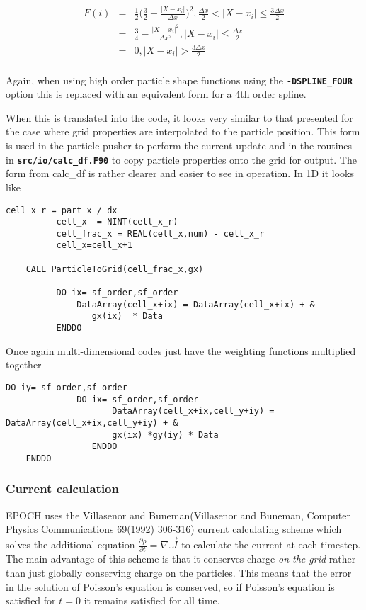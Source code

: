 \documentclass[12pt]{article}
\newcommand{\simpleboxverbatim}{\begin{Verbatim}[obeytabs=true,frame=single,
  framerule=0.5mm,rulecolor=\color{warwickmid}]}
\newcommand{\inlinecode}[1]{{\color{warwickred} \bf\texttt{#1}}}
\newcommand{\nEPOCH}{{\color{warwickdark}\fontfamily{phv}\selectfont EPOCH}}
\newcommand{\EPOCH}{{\nEPOCH} }
\begin{document}
\begin{eqnarray*}
  F(i) &=& \frac{1}{2} \bigl(\frac{3}{2} - \frac{|X - x_i|}{\Delta x} \bigr)^2, \frac{\Delta x}{2} < |X-x_i| \le \frac{3 \Delta x}{2}\\
  &=& \frac{3}{4} - \frac{|X-x_i|^2}{\Delta x^2}, |X-x_i| \le \frac{\Delta x}{2}\\
  &=& 0, |X-x_i| > \frac{3 \Delta x}{2}\\
\end{eqnarray*}

Again, when using high order particle shape functions using the
\inlinecode{-DSPLINE\_FOUR} option this is replaced with an equivalent form for
a 4th order spline.

When this is translated into the code, it looks very similar to that presented
for the case where grid properties are interpolated to the particle
position. This form is used in the particle pusher to perform the current
update and in the routines in \inlinecode{src/io/calc\_df.F90} to copy particle
properties onto the grid for output. The form from calc\_df is rather clearer
and easier to see in operation. In 1D it looks like

\simpleboxverbatim
          cell_x_r = part_x / dx
          cell_x  = NINT(cell_x_r)
          cell_frac_x = REAL(cell_x,num) - cell_x_r
          cell_x=cell_x+1

	CALL ParticleToGrid(cell_frac_x,gx)

          DO ix=-sf_order,sf_order
              DataArray(cell_x+ix) = DataArray(cell_x+ix) + &
                 gx(ix)  * Data
          ENDDO
\end{Verbatim}

Once again multi-dimensional codes just have the weighting functions multiplied
together
\simpleboxverbatim
	DO iy=-sf_order,sf_order
	          DO ix=-sf_order,sf_order
         		     DataArray(cell_x+ix,cell_y+iy) = DataArray(cell_x+ix,cell_y+iy) + &
	                 gx(ix) *gy(iy) * Data
         		 ENDDO
	ENDDO
\end{Verbatim}

\subsubsection{Current calculation}
\EPOCH uses the Villasenor and Buneman(Villasenor and Buneman, Computer Physics
Communications 69(1992) 306-316) current calculating scheme which solves the
additional equation $\frac{\partial \rho}{\partial t} = \nabla . \vec{J}$ to
calculate the current at each timestep. The main advantage of this scheme is
that it conserves charge {\it on the grid} rather than just globally conserving
charge on the particles. This means that the error in the solution of Poisson's
equation is conserved, so if Poisson's equation is satisfied for $t=0$ it
remains satisfied for all time.\\
\end{document}
